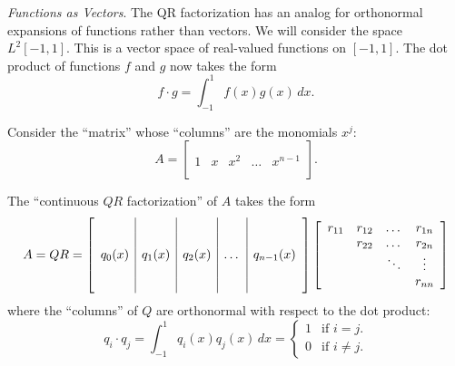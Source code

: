 \documentclass[12pt]{exam}
\begin{document}
\begin{questions}

\question \emph{Functions as Vectors}. The QR factorization has an analog for orthonormal expansions of functions rather than vectors. We will consider the space $L^2[-1,1]$. This is a vector space of real-valued functions on $[-1,1]$. The dot product of functions $f$ and $g$ now takes the form
\[f \cdot g = \int_{-1}^1 f(x) g(x)\,dx .\] 

Consider the ``matrix'' whose ``columns'' are the monomials $x^j$:
\[A = \left[ \begin{array}{c|c|c|c|c} & & & & \\ & & & & \\ 1 & x & x^2 & \dots & x^{n-1} \\ & & & & \\ & & & & \end{array} \right] .\]

The ``continuous $QR$ factorization'' of $A$ takes the form
\[A = QR = \left[ \begin{array}{c|c|c|c|c} & & & & \\ & & & & \\ q_0(x) & q_1(x) & q_2(x) & \dots & q_{n-1}(x) \\ & & & & \\ & & & & \end{array} \right] \left[ \begin{array}{c c c c} r_{11} & r_{12} & \dots & r_{1n} \\ & r_{22} & \dots & r_{2n} \\ & & \ddots & \vdots \\ & & & r_{nn} \end{array} \right] \]
where the ``columns'' of $Q$ are orthonormal with respect to the dot product:
\[q_i \cdot q_j = \int_{-1}^1 q_i(x) q_j(x)\,dx = \begin{cases} 1 & \text{if $i = j$.} \\ 0 & \text{if $i \neq j$.} \end{cases} \]


\end{questions}
\end{document}
